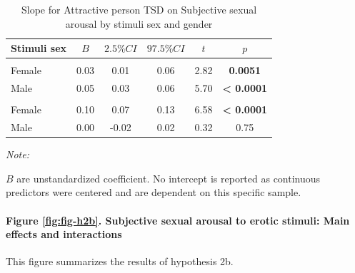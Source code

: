 \documentclass[
  bookmarksnumbered]{article}
\begin{document}
\begin{table}[H]
\centering
\caption{\label{tab:unnamed-chunk-24}Slope for Attractive person TSD on 
        Subjective sexual arousal by stimuli sex and gender}
\centering
\begin{threeparttable}
\begin{tabular}[t]{lccccc}
\toprule
Stimuli sex & $B$ & $2.5\% CI$ & $97.5\% CI$ & $t$ & $p$\\
\midrule
\addlinespace[0.3em]
\multicolumn{6}{l}{\cellcolor{lightgray}{Gender: Women}}\\
\hspace{1em}Female & 0.03 & 0.01 & 0.06 & 2.82 & \textbf{0.0051}\\
\hspace{1em}Male & 0.05 & 0.03 & 0.06 & 5.70 & \textbf{< 0.0001}\\
\addlinespace[0.3em]
\multicolumn{6}{l}{\cellcolor{lightgray}{Gender: Men}}\\
\hspace{1em}Female & 0.10 & 0.07 & 0.13 & 6.58 & \textbf{< 0.0001}\\
\hspace{1em}Male & 0.00 & -0.02 & 0.02 & 0.32 & 0.75\\
\bottomrule
\end{tabular}
\begin{tablenotes}[para]
\item \textit{Note: } 
\item $B$ are unstandardized coefficient.
           No intercept is reported as continuous predictors were centered
           and are dependent on this specific sample.
\end{tablenotes}
\end{threeparttable}
\end{table}

\paragraph{Figure \ref{fig:fig-h2b}. Subjective sexual arousal to erotic stimuli: Main effects and interactions}\label{figure-reffigfig-h2b.-subjective-sexual-arousal-to-erotic-stimuli-main-effects-and-interactions}

This figure summarizes the results of hypothesis 2b.
\end{document}
